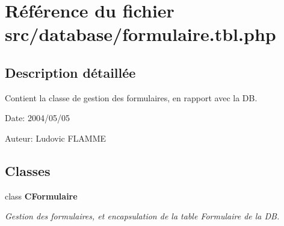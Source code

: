 \section{Référence du fichier src/database/formulaire.tbl.php}
\label{formulaire_8tbl_8php}


\subsection{Description détaillée}
Contient la classe de gestion des formulaires, en rapport avec la DB. 

\begin{Desc}
\item[Date:]2004/05/05\end{Desc}
\begin{Desc}
\item[Auteur:]Ludovic FLAMME \end{Desc}


\subsection*{Classes}
\begin{CompactItemize}
\item 
class {\bf CFormulaire}
\begin{CompactList}\small\item\em Gestion des formulaires, et encapsulation de la table Formulaire de la DB. \item\end{CompactList}\end{CompactItemize}

